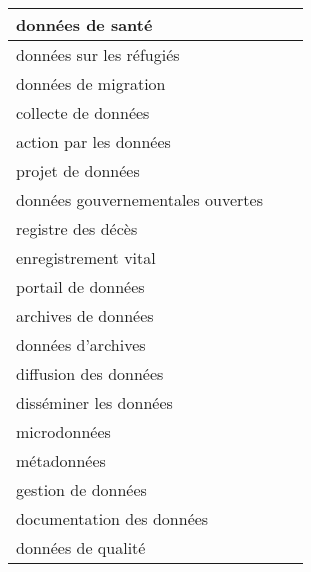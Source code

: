 \documentclass[
]{article}
\begin{document}
\begin{table}[H]
\begin{tabular}{l|l|l}
\hline
données de santé &  & \\
\hline
données sur les réfugiés &  & \\
\hline
données de migration &  & \\
\hline
collecte de données &  & \\
\hline
action par les données &  & \\
\hline
projet de données &  & \\
\hline
données gouvernementales ouvertes &  & \\
\hline
registre des décès &  & \\
\hline
enregistrement vital &  & \\
\hline
portail de données &  & \\
\hline
archives de données &  & \\
\hline
données d'archives &  & \\
\hline
diffusion des données &  & \\
\hline
disséminer les données &  & \\
\hline
microdonnées &  & \\
\hline
métadonnées &  & \\
\hline
gestion de données &  & \\
\hline
documentation des données &  & \\
\hline
données de qualité &  & \\
\hline
\end{tabular}
\endgroup{}
\end{table}
\end{document}
